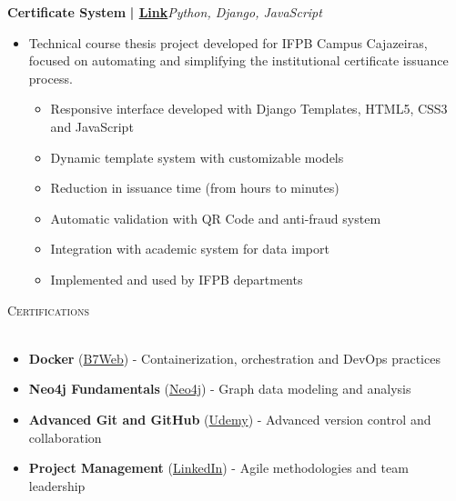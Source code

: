 \documentclass[a4paper]{article}
\newcommand{\lineunder}{
    \vspace*{-8pt} \\
    \hspace*{-18pt} \hrulefill \\
}
\newcommand{\header}[1]{
    {\hspace*{-18pt}\vspace*{6pt} \textsc{#1}}
    \vspace*{-6pt} \lineunder
}
\begin{document}
{\textbf{Certificate System}}\textbf{ | \href{https://github.com/bodescorp/Cext-final-}{Link}}\hfill{\sl Python, Django, JavaScript}\\
\vspace{-3mm}
\begin{itemize} \itemsep -3pt
    \item[] Technical course thesis project developed for IFPB Campus Cajazeiras, focused on automating and simplifying the institutional certificate issuance process.
        \begin{itemize}
            \item Responsive interface developed with Django Templates, HTML5, CSS3 and JavaScript
            \item Dynamic template system with customizable models
            \item Reduction in issuance time (from hours to minutes)
            \item Automatic validation with QR Code and anti-fraud system
            \item Integration with academic system for data import
            \item Implemented and used by IFPB departments
        \end{itemize}
\end{itemize}
\vspace*{2mm}

%
%
\header{Certifications}
\vspace{1mm}
\begin{itemize}[leftmargin=*] \itemsep -2pt    
    \item \textbf{Docker} (\href{https://drive.google.com/drive/folders/1YKThgvnT5h1bA_Hb0uDiIf7p8Qiph-NC}{B7Web})
    - Containerization, orchestration and DevOps practices
    
    \item \textbf{Neo4j Fundamentals} (\href{https://graphacademy.neo4j.com/c/9d25b259-5995-4053-8475-7b2bf61f163e/}{Neo4j})
    - Graph data modeling and analysis
    
    \item \textbf{Advanced Git and GitHub} (\href{https://www.udemy.com/certificate/UC-db57cce7-1471-47ff-9828-0e3a4d7da628/}{Udemy})
    - Advanced version control and collaboration
    
    \item \textbf{Project Management} (\href{https://www.linkedin.com/learning/certificates/0fc1a744c87dc72f53e8c694fd58809808a183327167377cb224c1ac43e732b6}{LinkedIn})
    - Agile methodologies and team leadership
\end{itemize}
\end{document}
